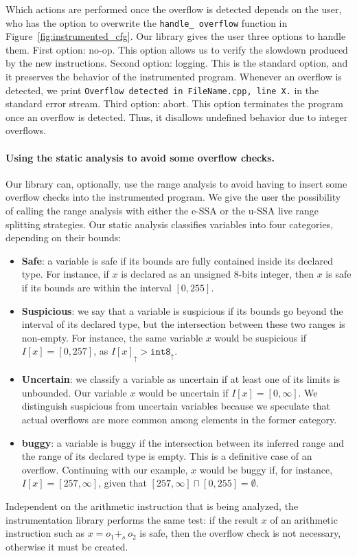 \documentclass[preprint]{sigplanconf}[10pt]
\newcommand{\ub}[1]{#1_{\uparrow}}
\begin{document}
Which actions are performed once the overflow is detected depends on the
user, who has the option to overwrite the \texttt{handle\_ overflow}
function in Figure~\ref{fig:instrumented_cfg}.
Our library gives the user three options to handle them. 
First option: no-op.
This option allows us to verify the slowdown produced by the new instructions.
Second option: logging.
This is the standard option, and it preserves the behavior of the instrumented
program.
Whenever an overflow is detected, we print \texttt{Overflow detected in
FileName.cpp, line X.} in the standard error stream.
Third option: abort.
This option terminates the program once an overflow is detected.
Thus, it disallows undefined behavior due to integer overflows.

\paragraph{Using the static analysis to avoid some overflow checks.}
Our library can, optionally, use the range analysis to avoid having to
insert some overflow checks into the instrumented program.
We give the user the possibility of calling the range analysis with either the
e-SSA or the u-SSA live range splitting strategies.
Our static analysis classifies variables into four categories, depending on
their bounds:
\begin{itemize}
\item \textbf{Safe}: a variable is safe if its bounds are fully contained
inside its declared type.
For instance, if $x$ is declared as an unsigned 8-bits integer, then $x$ is
safe if its bounds are within the interval $[0, 255]$.
\item \textbf{Suspicious}: we say that a variable is suspicious if its bounds
go beyond the interval of its declared type, but the intersection between
these two ranges is non-empty.
For instance, the same variable $x$ would be suspicious if
$I[x] = [0, 257]$, as $\ub{I[x]} > \ub{\mathtt{int8}}$.
\item \textbf{Uncertain}: we classify a variable as uncertain if at least one
of its limits is unbounded.
Our variable $x$ would be uncertain if $I[x] = [0, \infty]$.
We distinguish suspicious from uncertain variables because we speculate that
actual overflows are more common among elements in the former category.
\item \textbf{buggy}: a variable is buggy if the intersection between its
inferred range and the range of its declared type is empty.
This is a definitive case of an overflow.
Continuing with our example, $x$ would be buggy if, for instance,
$I[x] = [257, \infty]$, given that $[257, \infty] \sqcap [0, 255] = \emptyset$.
\end{itemize}
Independent on the arithmetic instruction that is being analyzed, the
instrumentation library performs the same test:
if the result $x$ of an arithmetic instruction such as $x = o_1 +_s \ o_2$ is
safe, then the overflow check is not necessary, otherwise it must be
created.
\end{document}
